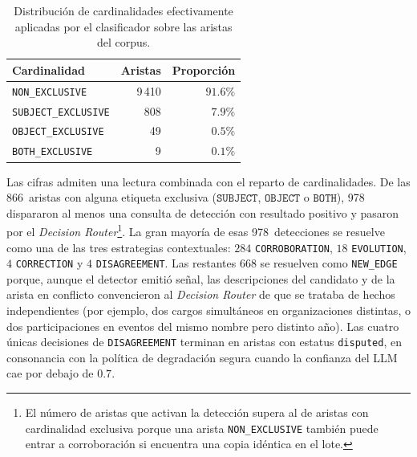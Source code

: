 \begin{table}[h]
\centering
\small
\begin{tabular}{lrr}
\hline
\textbf{Cardinalidad} & \textbf{Aristas} & \textbf{Proporción} \\ \hline
\texttt{NON\_EXCLUSIVE}     & 9\,410 & $91.6\%$ \\
\texttt{SUBJECT\_EXCLUSIVE} &   808  & $7.9\%$ \\
\texttt{OBJECT\_EXCLUSIVE}  &    49  & $0.5\%$ \\
\texttt{BOTH\_EXCLUSIVE}    &     9  & $0.1\%$ \\ \hline
\end{tabular}
\caption{Distribución de cardinalidades efectivamente aplicadas por el clasificador sobre las aristas del corpus.}
\label{tab:eval-ragtest-etcdr-cardinality}
\end{table}

Las cifras admiten una lectura combinada con el reparto de cardinalidades. De las 866~aristas con alguna etiqueta exclusiva ($\texttt{SUBJECT}$, $\texttt{OBJECT}$ o $\texttt{BOTH}$), 978 dispararon al menos una consulta de detección con resultado positivo y pasaron por el \emph{Decision Router}\footnote{El número de aristas que activan la detección supera al de aristas con cardinalidad exclusiva porque una arista \texttt{NON\_EXCLUSIVE} también puede entrar a corroboración si encuentra una copia idéntica en el lote.}. La gran mayoría de esas 978~detecciones se resuelve como una de las tres estrategias contextuales: $284$ \texttt{CORROBORATION}, $18$ \texttt{EVOLUTION}, $4$ \texttt{CORRECTION} y $4$ \texttt{DISAGREEMENT}. Las restantes $668$ se resuelven como \texttt{NEW\_EDGE} porque, aunque el detector emitió señal, las descripciones del candidato y de la arista en conflicto convencieron al \emph{Decision Router} de que se trataba de hechos independientes (por ejemplo, dos cargos simultáneos en organizaciones distintas, o dos participaciones en eventos del mismo nombre pero distinto año). Las cuatro únicas decisiones de \texttt{DISAGREEMENT} terminan en aristas con estatus \texttt{disputed}, en consonancia con la política de degradación segura cuando la confianza del LLM cae por debajo de $0.7$.

